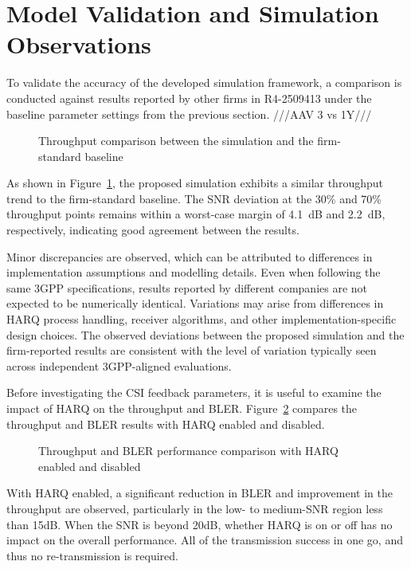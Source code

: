 \documentclass[a4paper,12pt,onecolumn]{article}
\begin{document}
	\section{Model Validation and Simulation Observations}
	
	To validate the accuracy of the developed simulation framework, a comparison is conducted against results reported by other firms in R4-2509413 \cite{3gpp_ran4_results} under the baseline parameter settings from the previous section.  ///AAV 3 vs 1Y///
	
	\begin{figure}[h]
		\centering
		
		\caption{Throughput comparison between the simulation and the firm-standard baseline}
		\label{fig:firmresultscomparison}
	\end{figure}

As shown in Figure~\ref{fig:firmresultscomparison}, the proposed simulation exhibits a similar throughput trend to the firm-standard baseline. The SNR deviation at the 30\% and 70\% throughput points remains within a worst-case margin of 4.1~dB and 2.2~dB, respectively, indicating good agreement between the results.


Minor discrepancies are observed, which can be attributed to differences in implementation assumptions and modelling details. Even when following the same 3GPP specifications, results reported by different companies are not expected to be numerically identical. Variations may arise from differences in HARQ process handling, receiver algorithms, and other implementation-specific design choices. The observed deviations between the proposed simulation and the firm-reported results are consistent with the level of variation typically seen across independent 3GPP-aligned evaluations.

Before investigating the CSI feedback parameters, it is useful to examine the impact of HARQ on the throughput and BLER. Figure~\ref{fig:harqonoff} compares the throughput and BLER results with HARQ enabled and disabled.


	\begin{figure}[h]
		\centering
		
		\caption{Throughput and BLER performance comparison with HARQ enabled and disabled}
		\label{fig:harqonoff}
	\end{figure}
With HARQ enabled, a significant reduction in BLER and improvement in the throughput are observed, particularly in the low- to medium-SNR region less than 15dB. When the SNR is beyond 20dB, whether HARQ is on or off has no impact on the overall performance. All of the transmission success in one go, and thus no re-transmission is required. 
\end{document}
